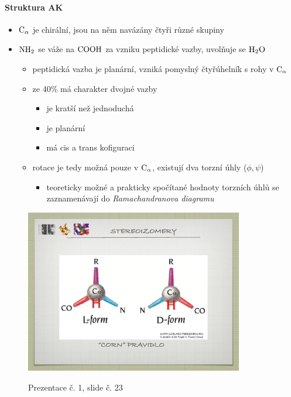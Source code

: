 \documentclass[DIV=8]{scrreprt}
\begin{document}
\paragraph{Struktura AK}
\begin{itemize}[nosep]
    \item \(\ce{C_\alpha}\) je chirální, jsou na něm navázány čtyři různé skupiny
    \item \(\ce{NH2}\) se váže na \(\ce{COOH}\) za vzniku peptidické vazby, uvolňuje se \(\ce{H2O}\)
\begin{itemize}[nosep]
    \item peptidická vazba je planární, vzniká pomyslný čtyřúhelník s rohy v \(\ce{C_\alpha}\)
    \item ze 40\% má charakter dvojné vazby
\begin{itemize}[nosep]
    \item je kratší než jednoduchá
    \item je planární
    \item má cis a trans kofiguraci
\end{itemize}

    \item rotace je tedy možná pouze v \(\ce{C_\alpha}\), existují dva torzní úhly (\(\phi, \psi\))
\begin{itemize}[nosep]
    \item teoreticky možné a prakticky spočítané hodnoty torzních úhlů se zaznamenávají do \emph{Ramachandranova diagramu}
\end{itemize}

\end{itemize}

\end{itemize}



\begin{figure}
    \caption{Prezentace č. 1, slide č. 23}
    \includegraphics[width=0.85\textwidth]{slides-1/slide-23.jpg}
    \centering
    \label{slides-1-slide-23}
\end{figure}
\end{document}
